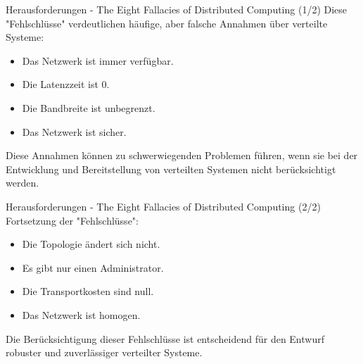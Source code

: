 \documentclass{beamer}
\begin{document}
\begin{frame}{Herausforderungen - The Eight Fallacies of Distributed Computing (1/2)}
  Diese "Fehlschlüsse" verdeutlichen häufige, aber falsche Annahmen über verteilte Systeme:
  \begin{itemize}
    \item Das Netzwerk ist immer verfügbar.
    \item Die Latenzzeit ist 0.
    \item Die Bandbreite ist unbegrenzt.
    \item Das Netzwerk ist sicher.
  \end{itemize}
  Diese Annahmen können zu schwerwiegenden Problemen führen, wenn sie bei der Entwicklung und Bereitstellung von verteilten Systemen nicht berücksichtigt werden.
\end{frame}


\begin{frame}{Herausforderungen - The Eight Fallacies of Distributed Computing (2/2)}
  Fortsetzung der "Fehlschlüsse":
  \begin{itemize}
    \item Die Topologie ändert sich nicht.
    \item Es gibt nur einen Administrator.
    \item Die Transportkosten sind null.
    \item Das Netzwerk ist homogen.
  \end{itemize}
  Die Berücksichtigung dieser Fehlschlüsse ist entscheidend für den Entwurf robuster und zuverlässiger verteilter Systeme.
\end{frame}
\end{document}
